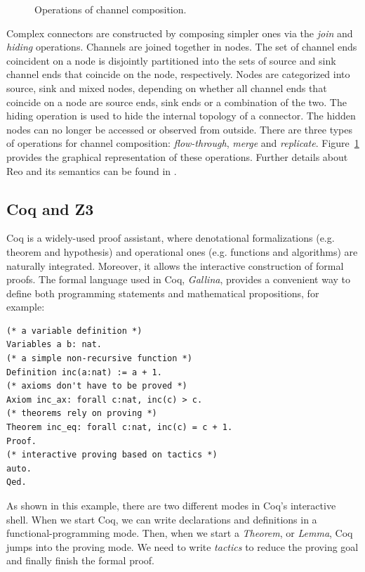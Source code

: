 \documentclass[preprint,3p]{elsarticle}
\newcommand{\xy}[1]{{#1}}
\begin{document}
\begin{figure}[ht]
\centering
{}
\caption{Operations of channel composition.}\label{fig:channelcomposition}
\end{figure}

Complex connectors are constructed by composing simpler ones \xy{via the \emph{join} and \emph{hiding} operations.} Channels are joined together in nodes. The set of channel ends coincident on a node is disjointly partitioned into the sets of source and sink channel ends that coincide on the node, respectively. Nodes are categorized into source, sink and mixed nodes, depending on whether all channel ends that coincide on a node are source ends, sink ends or a combination of the two. The hiding operation is used to hide the internal topology of a connector. The hidden nodes can no longer be accessed or observed from outside. There are three types of operations for channel composition: \emph{flow-through}, \emph{merge} and \emph{replicate}. Figure~\ref{fig:channelcomposition} provides the graphical representation of these operations. \xy{Further details about Reo and its semantics can be found in \cite{Arb04, AR03, BSAR06}.}

\subsection{Coq and Z3}

Coq \cite{huet1997coq} is a widely-used \xy{proof assistant, where denotational formalizations (e.g.
theorem and hypothesis) and operational ones} (e.g. functions and algorithms) are naturally
integrated. Moreover, it allows the interactive construction of formal proofs.
The formal language used in Coq, \emph{Gallina}, provides a convenient way to define
both programming statements and mathematical propositions, for example:
\begin{lstlisting}[language=coq]
(* a variable definition *)
Variables a b: nat.
(* a simple non-recursive function *)
Definition inc(a:nat) := a + 1.
(* axioms don't have to be proved *)
Axiom inc_ax: forall c:nat, inc(c) > c.
(* theorems rely on proving *)
Theorem inc_eq: forall c:nat, inc(c) = c + 1.
Proof.
(* interactive proving based on tactics *)
auto.
Qed.
\end{lstlisting}
As shown in this example, \xy{there are two different modes} in Coq's interactive shell. When
we start Coq, we can write declarations and definitions in a functional-programming mode. Then, when
we start a \emph{Theorem}, or \emph{Lemma}, Coq jumps into the proving mode. We need to \xy{write
\emph{tactics} }to reduce the proving goal and finally finish the formal proof.
\end{document}
